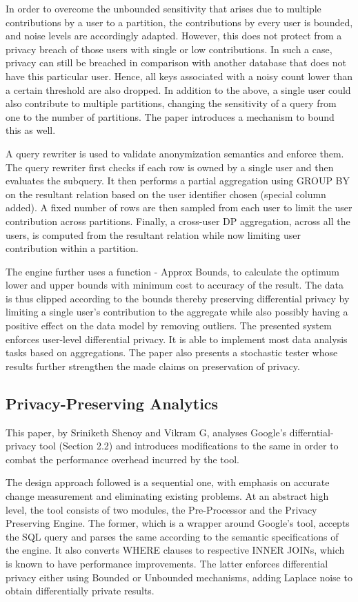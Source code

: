 \documentclass[acmsmall]{acmart}
\begin{document}
In order to overcome the unbounded sensitivity that arises due to multiple contributions by a user to a partition, the contributions by every user is bounded, and noise levels are accordingly adapted.
However, this does not protect from a privacy breach of those users with single or low contributions. In such a case, privacy can still be breached in comparison with another database that does not have this particular user. Hence, all keys associated with a noisy count lower than a certain threshold are also dropped.  In addition to the above, a single user could also contribute to multiple partitions, changing the sensitivity of a query from one to the number of partitions. The paper introduces a mechanism to bound this as well.

A query rewriter is used to validate anonymization semantics and enforce them. The query rewriter first checks if each row is owned by a single user and then evaluates the subquery. It then performs a partial aggregation using GROUP BY on the resultant relation based on the user identifier chosen (special column added). A fixed number of rows are then sampled from each user to limit the user contribution across partitions. Finally, a cross-user DP aggregation, across all the users, is computed from the resultant relation while now limiting user contribution within a partition.

The engine further uses a function - Approx Bounds, to calculate the optimum lower and upper bounds with minimum cost to accuracy of the result. The data is thus clipped according to the bounds thereby preserving differential privacy by limiting a single user’s contribution to the aggregate while also possibly having a positive effect on the data model by removing outliers. The presented system enforces user-level differential privacy. It is able to implement most data analysis tasks based on aggregations. The paper also presents a stochastic tester whose results further strengthen the made claims on preservation of privacy. 

\subsection{Privacy-Preserving Analytics}\label{2.3}
This paper\cite{srinivikram2020ppa}, by Sriniketh Shenoy and Vikram G, analyses Google's differntial-privacy tool (Section 2.2) and introduces modifications to the same in order to combat the performance overhead incurred by the tool. 

The design approach followed is a sequential one, with emphasis on accurate change measurement and eliminating existing problems. At an abstract high level, the tool consists of two modules, the Pre-Processor and the Privacy Preserving Engine. The former, which is a wrapper around Google's tool, accepts the SQL query and parses the same according to the semantic specifications of the engine. It also converts WHERE clauses to respective INNER JOINs, which is known to have performance improvements. The latter enforces differential privacy either using Bounded or Unbounded mechanisms, adding Laplace noise to obtain differentially private results. 
\end{document}
